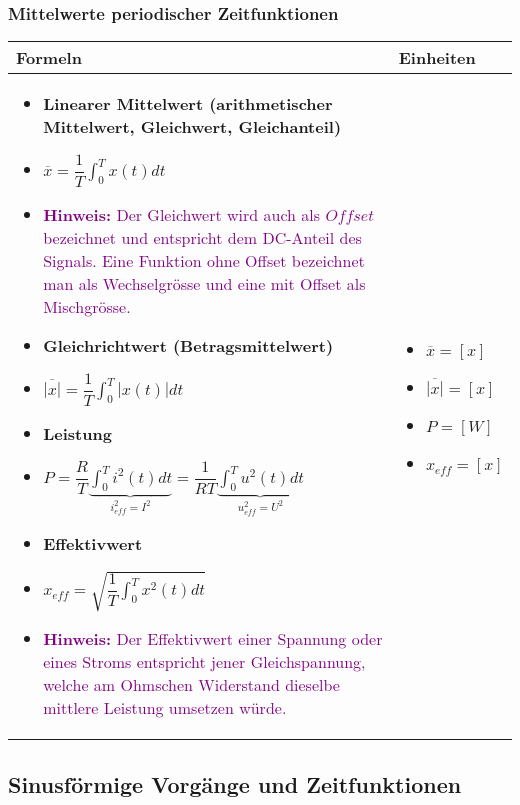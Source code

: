 \subsubsection{Mittelwerte periodischer Zeitfunktionen}
\begin{tabular}{ | m{15.5cm} | m{2.5cm}  | }
	\hline
	Formeln & Einheiten  \\ \hline
	\hline
	\begin{itemize}
		\item \textbf{Linearer Mittelwert (arithmetischer Mittelwert, Gleichwert, Gleichanteil)}
		\item[] $\overline{x}=\dfrac{1}{T}\displaystyle\int_{0}^{T}x(t)dt$
		\item[] \textcolor{purple}{\textbf{Hinweis:} Der Gleichwert wird auch als $Offset$ bezeichnet und entspricht dem DC-Anteil des Signals. Eine Funktion ohne Offset bezeichnet man als Wechselgrösse und eine mit Offset als Mischgrösse. }
		\item \textbf{Gleichrichtwert (Betragsmittelwert)}
		\item[] $\overline{|x|}=\dfrac{1}{T}\displaystyle\int_{0}^{T}|x(t)|dt$
		\item \textbf{Leistung}
		\item[] $P=\dfrac{R}{T}\underbrace{\displaystyle\int_{0}^{T}i^2(t)dt}_{i_{eff}^2=I^2}=\dfrac{1}{RT}\underbrace{\displaystyle\int_{0}^{T}u^2(t)dt}_{u_{eff}^2=U^2}$
		\item \textbf{Effektivwert}
		\item[] $x_{eff}=\sqrt{\dfrac{1}{T}\displaystyle\int_{0}^{T}x^2(t)dt}$
		\item[] \textcolor{purple}{\textbf{Hinweis:} Der Effektivwert einer Spannung oder eines Stroms entspricht jener Gleichspannung, welche am Ohmschen Widerstand dieselbe mittlere Leistung umsetzen würde. }
	\end{itemize}   
	&
	\begin{itemize}
		\item[] $\overline{x}=[x]$
		\item[] $\overline{|x|}=[x]$
		\item[] $P=[W]$
		\item[] $x_{eff}=[x]$
	\end{itemize} 	
	\\ \hline
\end{tabular}

\subsection{Sinusförmige Vorgänge und Zeitfunktionen}
